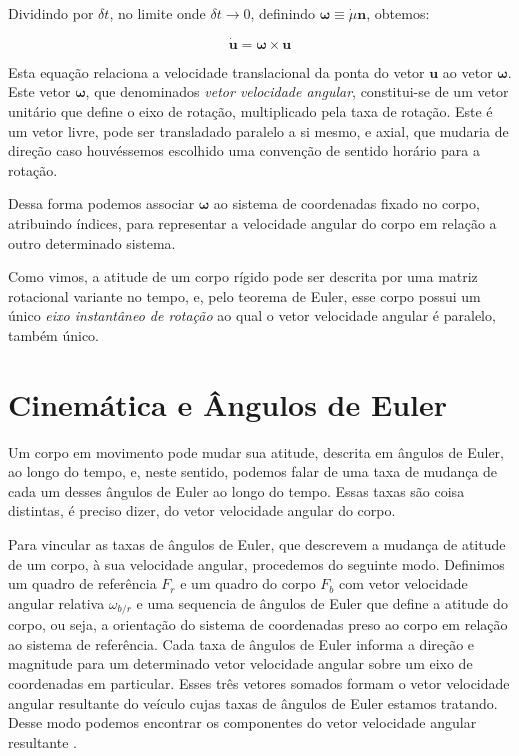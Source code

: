 Dividindo por \(\delta t\), no limite onde \(\delta t \rightarrow 0\), definindo \(\mathbf{\omega} \equiv \dot{\mu}\mathbf{n}\), obtemos:

\begin{equation}
    \dot{\mathbf{u}} = \mathbf{\omega}\!\times\!\mathbf{u}\label{eq:vector-derivative} %
\end{equation}

Esta equação relaciona a velocidade translacional da ponta do vetor \(\mathbf{u}\) ao vetor \(\mathbf{\omega}\). Este vetor \(\mathbf{\omega}\), que denominados \textit{vetor velocidade angular}, constitui-se de um vetor unitário  que define o eixo de rotação, multiplicado pela taxa de rotação. Este é um vetor livre, pode ser transladado paralelo a si mesmo, e axial, que mudaria de direção caso houvéssemos escolhido uma convenção de sentido horário para a rotação.

Dessa forma podemos associar \(\mathbf{\omega}\) ao sistema de coordenadas fixado no corpo, atribuindo índices, para representar a velocidade angular do corpo em relação a outro determinado sistema.

Como vimos, a atitude de um corpo rígido pode ser descrita por uma matriz rotacional variante no tempo, e, pelo teorema de Euler\footnotemark{}, esse corpo possui um único \emph{eixo instantâneo de rotação} ao qual o vetor velocidade angular é paralelo, também único.


\section{Cinemática e Ângulos de Euler}

Um corpo em movimento pode mudar sua atitude, descrita em ângulos de Euler, ao longo do tempo, e, neste sentido, podemos falar de uma taxa de mudança de cada um desses ângulos de Euler ao longo do tempo. Essas taxas são coisa distintas, é preciso dizer, do vetor velocidade angular do corpo.

Para vincular as taxas de ângulos de Euler, que descrevem a mudança de atitude de um corpo, à sua velocidade angular, procedemos do seguinte modo. Definimos um quadro de referência \(F_{r}\) e um quadro do corpo \(F_{b}\) com vetor velocidade angular relativa \(\omega_{b/r}\) e uma sequencia de ângulos de Euler que define a atitude do corpo, ou seja, a orientação do sistema de coordenadas preso ao corpo em relação ao sistema de referência. Cada taxa de ângulos de Euler informa a direção e magnitude para um determinado vetor velocidade angular sobre um eixo de coordenadas em particular. Esses três vetores somados formam o vetor velocidade angular resultante do veículo cujas taxas de ângulos de Euler estamos tratando. Desse modo podemos encontrar os componentes do vetor velocidade angular resultante \cite{Stevens2016}.

